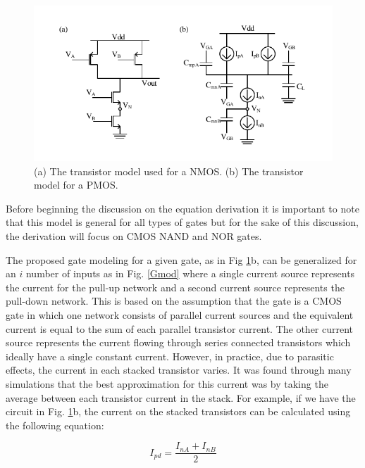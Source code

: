 \begin{figure}[!htbp]
	\centering
	\includegraphics[width=0.85\linewidth]{Figures/Conv_Mod}
	\caption{(a) The transistor model used for a NMOS. (b) The transistor model for a PMOS.}
	\label{Convert}
\end{figure}

Before beginning the discussion on the equation derivation it is important to note that this model is general for all types of gates but for the sake of this discussion, the derivation will focus on CMOS NAND and NOR gates.  

The proposed gate modeling for a given gate, as in Fig \ref{Convert}b, can be generalized for an $i$ number of inputs as in Fig. \ref{Gmod} where a single current source represents the current for the pull-up network and a second current source represents the pull-down network. This is based on the assumption that the gate is a CMOS gate in which one network consists of parallel current sources and the equivalent current is equal to the sum of each parallel transistor current. The other current source represents the current flowing through series connected transistors which ideally have a single constant current. However, in practice, due to parasitic effects, the current in each stacked transistor varies. It was found through many simulations that the best approximation for this current was by taking the average between each transistor current in the stack. For example, if we have the circuit in Fig. \ref{Convert}b, the current on the stacked transistors can be calculated using the following equation:

\begin{equation}\label{pdeq}
I_{pd} = \frac{I_{nA}+I_{nB}}{2}
\end{equation}

